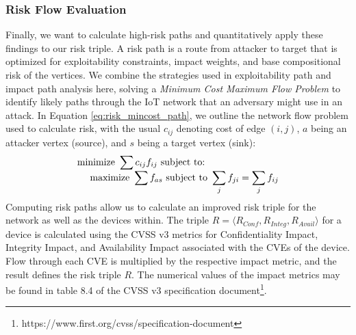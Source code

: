 \subsubsection{Risk Flow Evaluation} 
Finally, we want to calculate high-risk paths and quantitatively apply these findings to our risk triple. A risk path is a route from attacker to target that is optimized for exploitability constraints, impact weights, and base compositional risk of the vertices. We combine the strategies used in exploitability path and impact path analysis here, solving a \textit{Minimum Cost Maximum Flow Problem} to identify likely paths through the IoT network that an adversary might use in an attack. In Equation \ref{eq:risk_mincost_path}, we outline the network flow problem used to calculate risk, with the usual $c_{ij}$ denoting cost of edge $(i,j)$, $a$ being an attacker vertex (source), and $s$ being a target vertex (sink):
\begin{equation}
\begin{array}{ll@{}ll}
\text{minimize } \displaystyle\sum c_{ij}f_{ij}
\text{ subject to: } \\
\ \ \ \ \text{maximize } \displaystyle\sum\limits_{} f_{as} \text{ subject to } \displaystyle\sum\limits_{j} f_{ji} = \displaystyle\sum\limits_{j} f_{ij}
\end{array}
\label{eq:risk_mincost_path}
\end{equation}
Computing risk paths allow us to calculate an improved risk triple for the network as well as the devices within. The triple $R = \langle R_{Conf}, R_{Integ}, R_{Avail} \rangle$ for a device is calculated using the CVSS v3 metrics for Confidentiality Impact, Integrity Impact, and Availability Impact associated with the CVEs of the device. Flow through each CVE is multiplied by the respective impact metric, and the result defines the risk triple $R$. The numerical values of the impact metrics may be found in table 8.4 of the CVSS v3 specification document\footnote{https://www.first.org/cvss/specification-document}.
    
  



